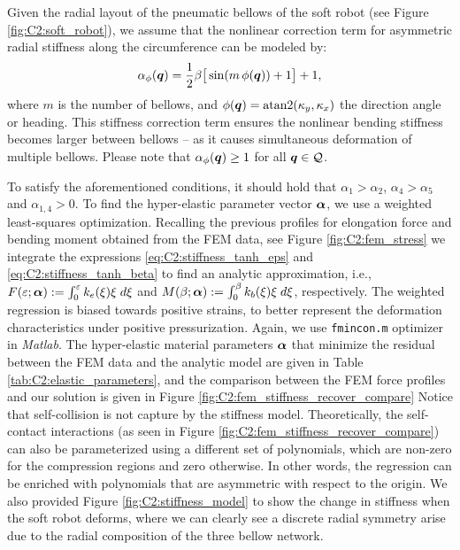 %
\begin{asm}
Given the radial layout of the pneumatic bellows of the soft robot (see Figure \ref{fig:C2:soft_robot}), we assume that the nonlinear correction term for asymmetric radial stiffness along the circumference can be modeled by:
%
\begin{equation}
\alpha_\phi ({\boldsymbol{q}}) = \frac{1}{2}\beta \big[\sin( m \,\phi({\boldsymbol{q}})) + 1 \big] + 1,
\end{equation}
%
where $m$ is the number of bellows, and $\phi({\boldsymbol{q}}) = \text{atan2}(\kappa_y,\kappa_x)$ the direction angle or heading. This stiffness correction term ensures the nonlinear bending stiffness becomes larger between bellows -- as it causes simultaneous deformation of multiple bellows. Please note that $\alpha_\phi({\boldsymbol{q}}) \ge 1$ for all ${\boldsymbol{q}} \in \mathcal{Q}$.
\end{asm}

To satisfy the aforementioned conditions, it should hold that $\alpha_1 > \alpha_2 $, $\alpha_4 > \alpha_5$ and $\alpha_{1,4} > 0$.  To find the hyper-elastic parameter vector ${\boldsymbol{\alpha}}$, we use a weighted least-squares optimization. Recalling the previous profiles for elongation force and bending moment obtained from the FEM data, see Figure \ref{fig:C2:fem_stress} we integrate the expressions \eqref{eq:C2:stiffness_tanh_eps} and \eqref{eq:C2:stiffness_tanh_beta} to find an analytic approximation, i.e., $F(\varepsilon; {\boldsymbol{\alpha}}):= \int_0^\varepsilon k_e(\xi) \xi \; d\xi$ and $M(\beta; {\boldsymbol{\alpha}}):= \int_0^\beta k_b(\xi) \xi \; d\xi$, respectively. The weighted regression is biased towards positive strains, to better represent the deformation characteristics under positive pressurization. Again, we use \texttt{fmincon.m} optimizer in \textit{Matlab}. The hyper-elastic material parameters ${\boldsymbol{\alpha}}$ that minimize the residual between the FEM data and the analytic model are given in Table \ref{tab:C2:elastic_parameters}, and the comparison between the FEM force profiles and our solution is given in Figure \ref{fig:C2:fem_stiffness_recover_compare} Notice that self-collision is not capture by the stiffness model. Theoretically, the self-contact interactions (as seen in Figure \ref{fig:C2:fem_stiffness_recover_compare}) can also be parameterized using a different set of polynomials, which are non-zero for the compression regions and zero otherwise. In other words, the regression can be enriched with polynomials that are asymmetric with respect to the origin. We also provided Figure \ref{fig:C2:stiffness_model} to show the change in stiffness when the soft robot deforms, where we can clearly see a discrete radial symmetry arise due to the radial composition of the three bellow network. 



